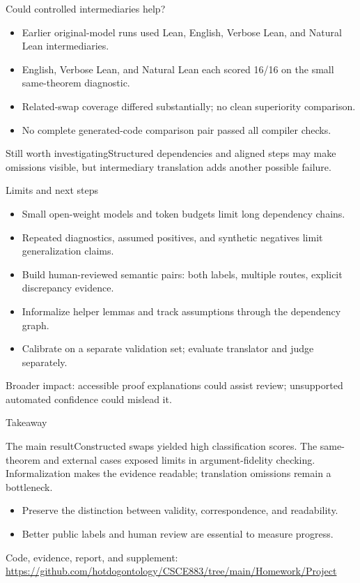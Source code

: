 \documentclass[aspectratio=169,11pt]{beamer}
\begin{document}
\begin{frame}{Could controlled intermediaries help?}
\begin{itemize}
\item Earlier original-model runs used Lean, English, Verbose Lean, and Natural Lean intermediaries.
\item English, Verbose Lean, and Natural Lean each scored 16/16 on the small same-theorem diagnostic.
\item Related-swap coverage differed substantially; no clean superiority comparison.
\item No complete generated-code comparison pair passed all compiler checks.
\end{itemize}
\begin{block}{Still worth investigating}Structured dependencies and aligned steps may make omissions visible, but intermediary translation adds another possible failure.\end{block}
\end{frame}
\begin{frame}{Limits and next steps}
\begin{itemize}
\item Small open-weight models and token budgets limit long dependency chains.
\item Repeated diagnostics, assumed positives, and synthetic negatives limit generalization claims.
\item Build human-reviewed semantic pairs: both labels, multiple routes, explicit discrepancy evidence.
\item Informalize helper lemmas and track assumptions through the dependency graph.
\item Calibrate on a separate validation set; evaluate translator and judge separately.
\end{itemize}
\small Broader impact: accessible proof explanations could assist review; unsupported automated confidence could mislead it.
\end{frame}
\begin{frame}{Takeaway}
\begin{block}{The main result}Constructed swaps yielded high classification scores. The same-theorem and external cases exposed limits in argument-fidelity checking. Informalization makes the evidence readable; translation omissions remain a bottleneck.\end{block}
\begin{itemize}\item Preserve the distinction between validity, correspondence, and readability.
\item Better public labels and human review are essential to measure progress.
\end{itemize}
\small Code, evidence, report, and supplement:\\
\url{https://github.com/hotdogontology/CSCE883/tree/main/Homework/Project}
\end{frame}
\end{document}
